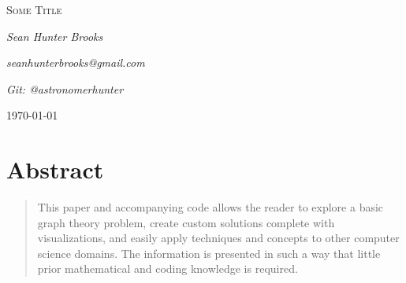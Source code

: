 \documentclass[12pt]{article}
\begin{document}





\begin{titlepage}
	\centering
	{\scshape\LARGE Some Title \par}
	\vspace{4cm}
	{\Large\itshape Sean Hunter Brooks\par}
	{\Large\itshape seanhunterbrooks@gmail.com\par}
	{\Large\itshape Git: @astronomerhunter\par}
	\vspace{9cm}
	\vfill
	{\large \today\par}
\end{titlepage}

\section*{Abstract}

\begin{quote}

This paper and accompanying code allows the reader to explore a basic graph theory problem, create custom solutions complete with visualizations, and easily apply techniques and concepts to other computer science domains.  The information is presented in such a way that little prior mathematical and coding knowledge is required.

\end{quote}
\end{document}
